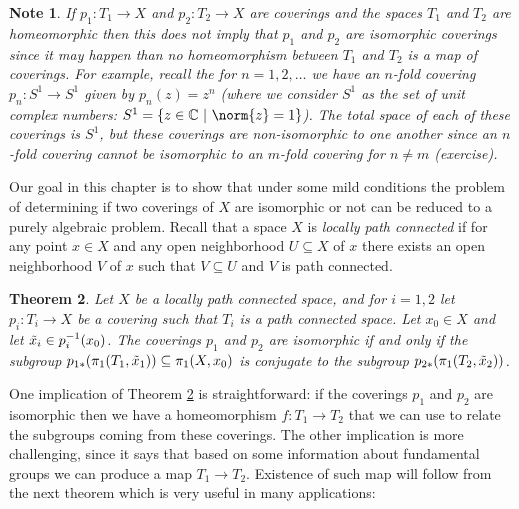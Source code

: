 \documentclass[11pt, letterpaper, oneside]{report}
\theoremstyle{pplain}
\newtheorem{theorem}{Theorem}[chapter]
\theoremstyle{ddefinition}
\newtheorem{note}[theorem]{Note}
\theoremstyle{nnn}
\theoremstyle{eexercise}
\newcommand{\C}{{\mathbb C}}
\newcommand{\ntilde}{\skew{3}\tilde}
\begin{document}
\begin{note}
If  $p_{1}\colon T_{1}\to X$ and  $p_{2}\colon T_{2}\to X$ are coverings and the spaces 
$T_{1}$ and $T_{2}$ are homeomorphic  then this does not imply that $p_{1}$ and $p_{2}$ 
are isomorphic coverings since it may happen than no homeomorphism between $T_{1}$
and $T_{2}$ is a map of coverings. For example, recall the for $n=1, 2, \dots$ we have 
an $n$-fold covering $p_{n}\colon S^{1} \to S^{1}$ given by $p_{n}(z) = z^{n}$
(where we consider $S^{1}$ as the set of unit complex numbers: $S^{1} = \{z \in \C \ | \ \norm{z} = 1 \}$). 
The total space of each of these coverings is $S^{1}$, but these coverings are non-isomorphic to one another
since an $n$-fold covering cannot be isomorphic to an $m$-fold covering for $n\neq m$ (exercise).  
\end{note}

Our goal in this chapter is to show that under some mild conditions the problem of determining if two 
coverings of $X$ are isomorphic or not can be reduced to a purely algebraic problem. Recall that a space $X$ is 
\emph{locally path connected} if for any point $x\in X$ and any open neighborhood $U\subseteq X$ of $x$
there exists an open neighborhood $V$ of $x$ such that $V\subseteq U$ and $V$ is path connected. 

\begin{theorem}
\label{CLASSOFCOVERINGS THM}
Let $X$ be a locally path connected space, and for $i=1, 2$ let $p_{i}\colon T_{i}\to X$ be a covering 
such that $T_{i}$ is a path connected space. Let $x_{0}\in X$ and let $\ntilde{x}_{i}\in p_{i}^{-1}(x_{0})$. 
The coverings $p_{1}$ and $p_{2}$ are isomorphic if and only if the subgroup 
$p_{1\ast}(\pi_{1}(T_{1}, \ntilde{x}_{1}))\subseteq \pi_{1}(X, x_{0})$ is conjugate to 
the subgroup $p_{2\ast}(\pi_{1}(T_{2}, \ntilde{x}_{2}))$.
\end{theorem}

One implication of Theorem \ref{CLASSOFCOVERINGS THM} is straightforward: if the coverings $p_{1}$
and $p_{2}$ are isomorphic then we have a homeomorphism $f\colon T_{1}\to T_{2}$ that we can use 
to relate the subgroups coming from these  coverings.  The other implication is more challenging, since 
it says that based on some information about fundamental groups we can produce a map $T_{1}\to T_{2}$.
Existence of such map will follow from the next theorem which is very useful in many  applications:
\end{document}

